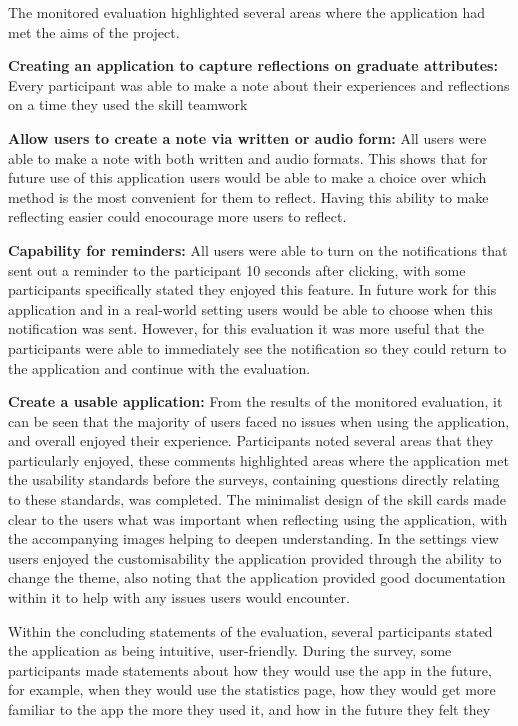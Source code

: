 \documentclass{l4proj}
\begin{document}
The monitored evaluation highlighted several areas where the application had met the aims of the project.
\par 
\textbf{Creating an application to capture reflections on graduate attributes:} Every participant was able to make a note
about their experiences and reflections on a time they used the skill teamwork
\par 
\textbf{Allow users to create a note via written or audio form:} All users were able to make a note with both written and audio
formats. This shows that for future use of this application users would be able to make a choice over which method is the 
most convenient for them to reflect. Having this ability to make reflecting easier could enocourage more users to reflect.
\par 
\textbf{Capability for reminders:} All users were able to turn on the notifications that sent out a reminder to the participant
10 seconds after clicking, with some participants specifically stated they enjoyed this feature.
 In future work for this application and in a real-world setting users would be able to choose when this 
notification was sent. However, for this evaluation it was more useful that the participants were able to immediately see the 
notification so they could return to the application and continue with the evaluation.
\par 
\textbf{Create a usable application:} From the results of the monitored evaluation, it can be seen that the majority of users faced no issues when using the application,
and overall enjoyed their experience. Participants noted several areas that they particularly enjoyed, these comments highlighted 
areas where the application met the usability standards before the surveys, containing questions directly relating to these standards,
was completed. The minimalist design of 
the skill cards made clear to the users what was important when reflecting using the application, with the accompanying images
helping to deepen understanding. In the settings view users enjoyed the customisability the application provided through the ability to
change the theme, also noting that the application provided good documentation within it to help with any issues users would encounter.
\par 
Within the concluding statements of the evaluation, several participants stated the application as being intuitive, user-friendly.
During the survey, some participants made statements about how they would use the app in the future, for example, when they would
use the statistics page, how they would get more familiar to the app the more they used it, and how in the future they felt they 
\end{document}
